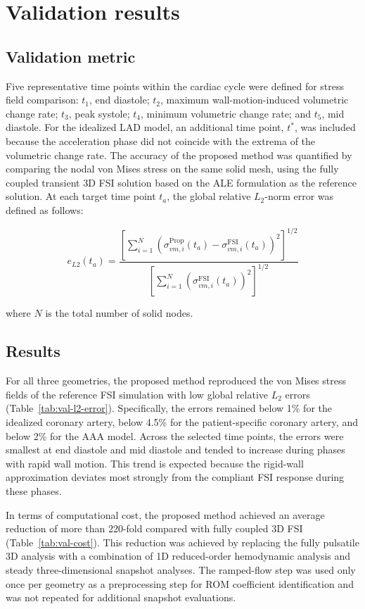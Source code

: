 \documentclass[master,english,final]{kaist-ucs}
\begin{document}
\section{Validation results}
\subsection{Validation metric}
Five representative time points within the cardiac cycle were defined for stress field comparison: $t_1$, end diastole; $t_2$, maximum wall-motion-induced volumetric change rate; $t_3$, peak systole; $t_4$, minimum volumetric change rate; and $t_5$, mid diastole. For the idealized LAD model, an additional time point, $t^{*}$, was included because the acceleration phase did not coincide with the extrema of the volumetric change rate. The accuracy of the proposed method was quantified by comparing the nodal von Mises stress on the same solid mesh, using the fully coupled transient 3D FSI solution based on the ALE formulation as the reference solution. At each target time point $t_a$, the global relative $L_2$-norm error was defined as follows:

\begin{equation}
e_{L2}(t_a) = \frac{\left[\sum_{i=1}^{N}\left(\sigma^{\mathrm{Prop}}_{vm,i}(t_a) - \sigma^{\mathrm{FSI}}_{vm,i}(t_a)\right)^2\right]^{1/2}}{\left[\sum_{i=1}^{N}\left(\sigma^{\mathrm{FSI}}_{vm,i}(t_a)\right)^2\right]^{1/2}}
\end{equation}

where $N$ is the total number of solid nodes.

\subsection{Results}
For all three geometries, the proposed method reproduced the von Mises stress fields of the reference FSI simulation with low global relative $L_2$ errors (Table~\ref{tab:val-l2-error}). Specifically, the errors remained below 1\% for the idealized coronary artery, below 4.5\% for the patient-specific coronary artery, and below 2\% for the AAA model. Across the selected time points, the errors were smallest at end diastole and mid diastole and tended to increase during phases with rapid wall motion. This trend is expected because the rigid-wall approximation deviates most strongly from the compliant FSI response during these phases.

In terms of computational cost, the proposed method achieved an average reduction of more than 220-fold compared with fully coupled 3D FSI (Table~\ref{tab:val-cost}). This reduction was achieved by replacing the fully pulsatile 3D analysis with a combination of 1D reduced-order hemodynamic analysis and steady three-dimensional snapshot analyses. The ramped-flow step was used only once per geometry as a preprocessing step for ROM coefficient identification and was not repeated for additional snapshot evaluations.
\end{document}
